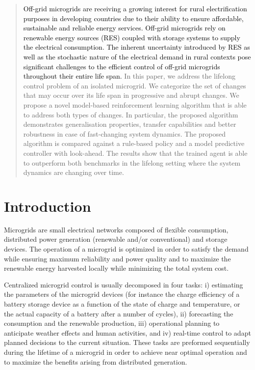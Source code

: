 \documentclass{article}
\begin{document}
\printAffiliationsAndNotice{\icmlEqualContribution} %

\begin{abstract}
    \textcolor{black}{Off-grid microgrids are receiving a growing interest for rural electrification purposes in developing countries due to their ability to ensure affordable, sustainable and reliable energy services. Off-grid microgrids rely on renewable energy sources (RES) coupled with storage systems to supply the electrical consumption. The inherent uncertainty introduced by RES as well as the stochastic nature of the electrical demand in rural contexts pose significant challenges to the efficient control of off-grid microgrids throughout their entire life span.} In this paper, we address the lifelong control problem of an isolated microgrid. We categorize the set of changes that may occur over its life span in progressive and abrupt changes. We propose a novel model-based reinforcement learning algorithm that is able to address both types of changes. In particular, the proposed algorithm demonstrates generalisation properties, transfer capabilities and better robustness in case of fast-changing system dynamics. The proposed algorithm is compared against a rule-based policy and a model predictive controller with look-ahead. The results show that the trained agent is able to outperform both benchmarks in the lifelong setting where the system dynamics are changing over time.
\end{abstract}

\section{ Introduction} \label{sec: Introduction}
	Microgrids are small electrical networks composed of flexible consumption, distributed power generation (renewable and/or conventional) and storage devices. The operation of a microgrid is optimized in order to satisfy the demand while ensuring maximum reliability and power quality and to maximize the renewable energy harvested locally while minimizing the total system cost.

	Centralized microgrid control is usually decomposed in four tasks: i) estimating the parameters of the microgrid devices (for instance the charge efficiency of a battery storage device as a function of the state of charge and temperature, or the actual capacity of a battery after a number of cycles), ii) forecasting the consumption and the renewable production, iii) operational planning to anticipate weather effects and human activities, and iv) real-time control to adapt planned decisions to the current situation. These tasks are preformed sequentially during the lifetime of a microgrid in order to achieve near optimal operation and to maximize the benefits arising from distributed generation. 
\end{document}
